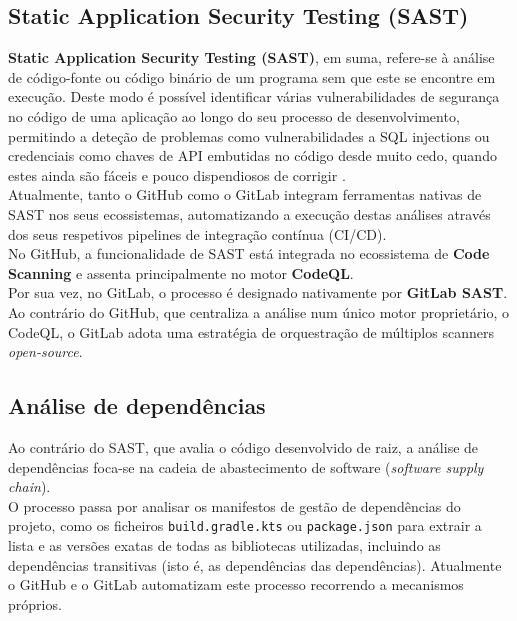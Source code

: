 \subsection{Static Application Security Testing (SAST)}

\textbf{Static Application Security Testing (SAST)}, em suma, refere-se à análise de código-fonte ou código binário de um programa sem que este se encontre em execução. Deste modo é possível identificar várias vulnerabilidades de segurança no código de uma aplicação ao longo do seu processo de desenvolvimento, permitindo a deteção de problemas como vulnerabilidades a SQL injections ou credenciais como chaves de API embutidas no código desde muito cedo, quando estes ainda são fáceis e pouco dispendiosos de corrigir \cite{sonarsource_sast_guide} \cite{gitlab_sast_docs}. \\

Atualmente, tanto o GitHub como o GitLab integram ferramentas nativas de SAST nos seus ecossistemas, automatizando a execução destas análises através dos seus respetivos pipelines de integração contínua (CI/CD). \\

No GitHub, a funcionalidade de SAST está integrada no ecossistema de \textbf{Code Scanning} e assenta principalmente no motor \textbf{CodeQL}. \\

Por sua vez, no GitLab, o processo é designado nativamente por \textbf{GitLab SAST}. Ao contrário do GitHub, que centraliza a análise num único motor proprietário, o CodeQL, o GitLab adota uma estratégia de orquestração de múltiplos scanners \textit{open-source}. \\

\subsection{Análise de dependências}

Ao contrário do SAST, que avalia o código desenvolvido de raiz, a análise de dependências foca-se na cadeia de abastecimento de software (\textit{software supply chain}). \\

O processo passa por analisar os manifestos de gestão de dependências do projeto, como os ficheiros \texttt{build.gradle.kts} ou \texttt{package.json} para extrair a lista e as versões exatas de todas as bibliotecas utilizadas, incluindo as dependências transitivas (isto é, as dependências das dependências). Atualmente o GitHub e o GitLab automatizam este processo recorrendo a mecanismos próprios. \\

